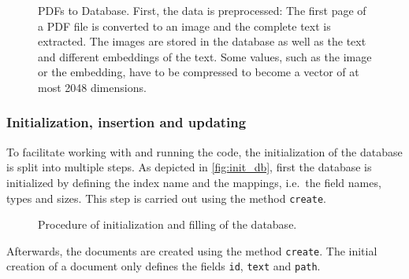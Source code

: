 \begin{figure}[!htb] %
    \centering
    
    \caption[Database procedure]{PDFs to Database. 
    First, the data is preprocessed:
    The first page of a PDF file is converted to an image and the complete text is extracted. 
    The images are stored in the database as well as the text and different embeddings of the text.
    Some values, such as the image or the \infersent{} embedding, have to be compressed to become a vector of at most 2048 dimensions.
    }
    \label{fig:pdf2db}
\end{figure}

\subsubsection*{Initialization, insertion and updating}
To facilitate working with and running the code, the initialization of the database is split into multiple steps.
As depicted in \autoref{fig:init_db}, first the database is initialized by defining the index name and the mappings, i.e.\ the field names, types and sizes.
This step is carried out using the method \texttt{create}.

\begin{figure}[!htb] %
    \centering
    
    \caption[Initialization and filling of the database]{Procedure of initialization and filling of the database.}
    \label{fig:init_db}
\end{figure}

Afterwards, the documents are created using the method \texttt{create}.
The initial creation of a document only defines the fields \texttt{id}, \texttt{text} and \texttt{path}.


